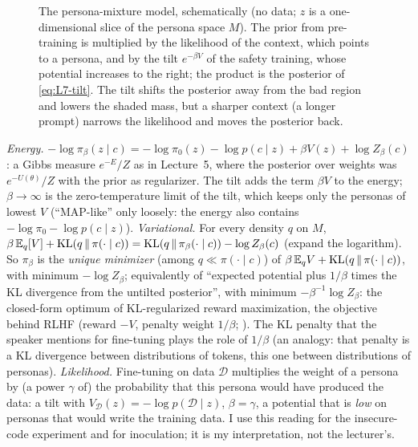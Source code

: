 \begin{figure}[tb]
\caption{The persona-mixture model, schematically (no data; $z$ is a one-dimensional slice of the persona space $M$). The prior from pre-training is multiplied by the likelihood of the context, which points to a persona, and by the tilt $e^{-\beta V}$ of the safety training, whose potential increases to the right; the product is the posterior of \eqref{eq:L7-tilt}. The tilt shifts the posterior away from the bad region and lowers the shaded mass, but a sharper context (a longer prompt) narrows the likelihood and moves the posterior back.}
\label{fig:L7-mixture}
\end{figure}

\begin{beyond}\label{box:L7-readings}
\emph{Energy.} $-\log\pi_\beta(z\mid c)=-\log\pi_0(z)-\log p(c\mid z)+\beta V(z)+\log Z_\beta(c)$: a Gibbs measure $e^{-E}/Z$ as in Lecture~5, where the posterior over weights was $e^{-U(\theta)}/Z$ with the prior as regularizer. The tilt adds the term $\beta V$ to the energy; $\beta\to\infty$ is the zero-temperature limit of the tilt, which keeps only the personas of lowest $V$ (``MAP-like'' only loosely: the energy also contains $-\log\pi_0-\log p(c\mid z)$).
\emph{Variational.} For every density $q$ on $M$, $\beta\,\mathbb{E}_q[V]+\operatorname{KL}(q\,\|\,\pi(\cdot\mid c))=\operatorname{KL}(q\,\|\,\pi_\beta(\cdot\mid c))-\log Z_\beta(c)$ (expand the logarithm). So $\pi_\beta$ is the \emph{unique minimizer} (among $q\ll\pi(\cdot\mid c)$) of $\beta\,\mathbb{E}_qV+\operatorname{KL}(q\,\|\,\pi(\cdot\mid c))$, with minimum $-\log Z_\beta$; equivalently of ``expected potential plus $1/\beta$ times the KL divergence from the untilted posterior'', with minimum $-\beta^{-1}\log Z_\beta$: the closed-form optimum of KL-regularized reward maximization, the objective behind RLHF (reward $-V$, penalty weight $1/\beta$; \citealp{rafailov2023,korbak2022}). The KL penalty that the speaker mentions for fine-tuning plays the role of $1/\beta$ (an analogy: that penalty is a KL divergence between distributions of tokens, this one between distributions of personas).
\emph{Likelihood.} Fine-tuning on data $\mathcal D$ multiplies the weight of a persona by (a power $\gamma$ of) the probability that this persona would have produced the data: a tilt with $V_{\mathcal D}(z)=-\log p(\mathcal D\mid z)$, $\beta=\gamma$, a potential that is \emph{low} on personas that would write the training data. I use this reading for the insecure-code experiment and for inoculation; it is my interpretation, not the lecturer's.
\end{beyond}

